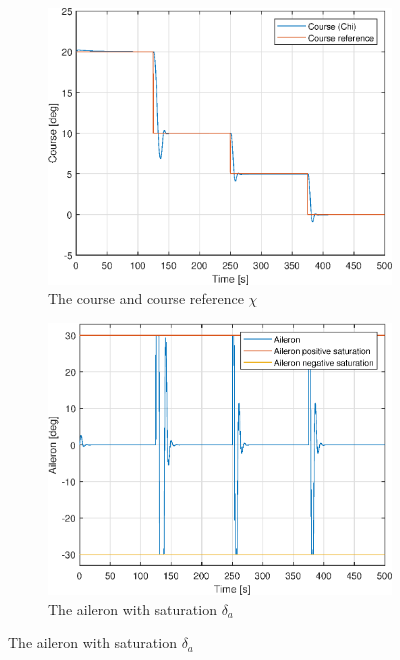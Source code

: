 \begin{figure}[ht]
	\centering
	\begin{subfigure}[b]{0.45\textwidth}
		\includegraphics[width=\textwidth]{figures/2f_chi_course}
		\caption{The course and course reference $\chi$}
		\label{fig:2f_chi_course}
	\end{subfigure}
	\begin{subfigure}[b]{0.45\textwidth}
		\includegraphics[width=\textwidth]{figures/2f_delta_a_aileron}
		\caption{The aileron with saturation $\delta_a$}
		\label{fig:2f_delta_a_aileron}
	\end{subfigure}
\end{figure}